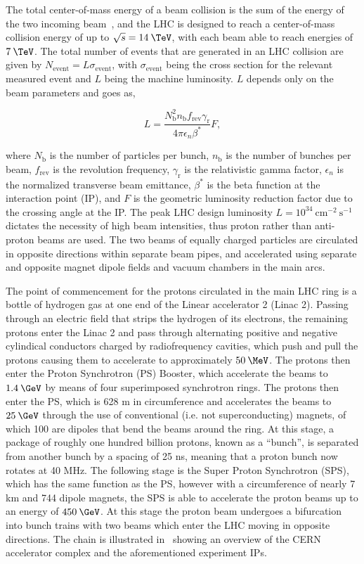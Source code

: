 The total center-of-mass energy of a beam collision is the sum of the energy of the two incoming beam~\cite{martin2008particle}, and the LHC is designed to reach a center-of-mass collision energy of up to $\sqrt{s}=14\:\TeV$, with each beam able to reach energies of $7\:\TeV$. The total number of events that are generated in an LHC collision are given by $N_{\textrm{event}}=L\sigma_{\textrm{event}}$, with $\sigma_{\textrm{event}}$ being the cross section for the relevant measured event and $L$ being the machine luminosity. $L$ depends only on the beam parameters and goes as,

\begin{equation}
  L = \frac{N_{\textrm{b}}^{2}n_{\textrm{b}}f_{\textrm{rev}}\gamma_{\textrm{r}}}{4\pi\epsilon_n\beta^*}F,
  \label{eq:lumi}
\end{equation}

where $N_{\textrm{b}}$ is the number of particles per bunch, $n_{\textrm{b}}$ is the number of bunches per beam, $f_{\textrm{rev}}$ is the revolution frequency, $\gamma_{\textrm{r}}$ is the relativistic gamma factor, $\epsilon_n$ is the normalized transverse beam emittance, $\beta^*$ is the beta function at the interaction point (IP), and $F$ is the geometric luminosity reduction factor due to the crossing angle at the IP. The peak LHC design luminosity $L=10^{34}\:\textrm{cm}^{-2}\:\textrm{s}^{-1}$ dictates the necessity of high beam intensities, thus proton rather than anti-proton beams are used. The two beams of equally charged particles are circulated in opposite directions within separate beam pipes, and accelerated using separate and opposite magnet dipole fields and vacuum chambers in the main arcs.

The point of commencement for the protons circulated in the main LHC ring is a bottle of hydrogen gas at one end of the Linear accelerator 2 (Linac 2). Passing through an electric field that strips the hydrogen of its electrons, the remaining protons enter the Linac 2 and pass through alternating positive and negative cylindical conductors charged by radiofrequency cavities, which push and pull the protons causing them to accelerate to approximately $50\:\MeV$. The protons then enter the Proton Synchrotron (PS) Booster, which accelerate the beams to $1.4\:\GeV$ by means of four superimposed synchrotron rings. The protons then enter the PS, which is 628 m in circumference and accelerates the beams to $25\:\GeV$ through the use of conventional (i.e. not superconducting) magnets, of which 100 are dipoles that bend the beams around the ring. At this stage, a package of roughly one hundred billion protons, known as a ``bunch'', is separated from another bunch by a spacing of 25 ns, meaning that a proton bunch now rotates at 40 MHz. The following stage is the Super Proton Synchrotron (SPS), which has the same function as the PS, however with a circumference of nearly 7 km and 744 dipole magnets, the SPS is able to accelerate the proton beams up to an energy of $450\:\GeV$. At this stage the proton beam undergoes a bifurcation into bunch trains with two beams which enter the LHC moving in opposite directions. The chain is illustrated in~ showing an overview of the CERN accelerator complex and the aforementioned experiment IPs.

